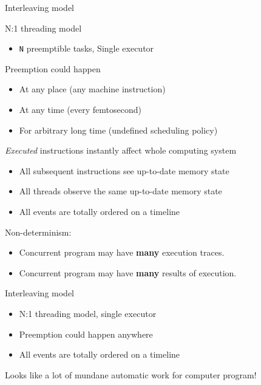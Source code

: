 \begin{frame}[t]{Interleaving model}

N:1 threading model
\begin{itemize}
    \item \texttt{N} preemptible tasks, Single executor    
\end{itemize}

Preemption could happen
\begin{itemize}
    \item At any place (any machine instruction)
    \item At any time (every femtosecond)
    \item For arbitrary long time (undefined scheduling policy)
\end{itemize}        

\textit{Executed} instructions instantly affect whole computing system
\begin{itemize}
    \item All subsequent instructions see up-to-date memory state
    \item All threads observe the same up-to-date memory state
    \item All events are totally ordered on a timeline
\end{itemize}

Non-determinism:
\begin{itemize}
    \item Concurrent program may have \textbf{many} execution traces.
    \item Concurrent program may have \textbf{many} results of execution.
\end{itemize}
\end{frame}

\begin{frame}[t,noframenumbering]{Interleaving model}

\begin{itemize}
    \item N:1 threading model, single executor
    \item Preemption could happen anywhere
    \item All events are totally ordered on a timeline
\end{itemize}
\pause

Looks like a lot of mundane automatic work for computer program!
\end{frame}




